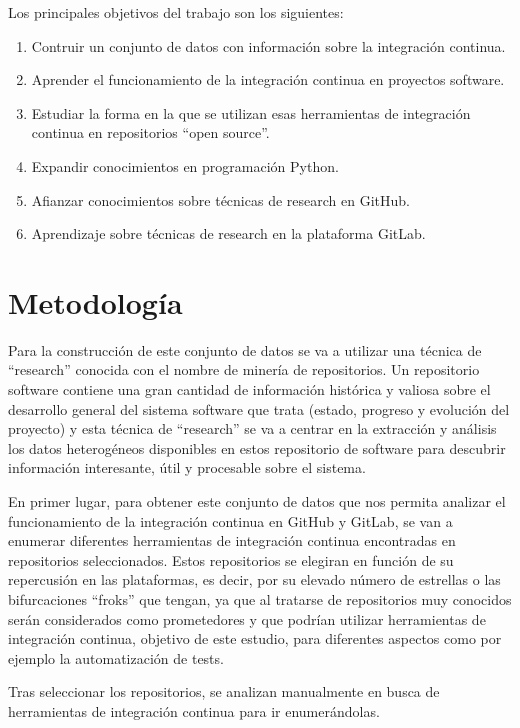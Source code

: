 Los principales objetivos del trabajo son los siguientes:
\begin{enumerate}
    \item Contruir un conjunto de datos con información sobre la integración continua.
    \item Aprender el funcionamiento de la integración continua en proyectos software.
    \item Estudiar la forma en la que se utilizan esas herramientas de integración continua en repositorios ``open source''.
    \item Expandir conocimientos en programación Python.
    \item Afianzar conocimientos sobre técnicas de research en GitHub.
    \item Aprendizaje sobre técnicas de research en la plataforma GitLab.
\end{enumerate}

\section{Metodología}

Para la construcción de este conjunto de datos se va a utilizar una técnica de ``research'' conocida con el nombre de minería de repositorios.
Un repositorio software contiene una gran cantidad de información histórica y valiosa sobre el desarrollo general del sistema software que trata (estado, progreso y evolución del proyecto) y esta técnica de ``research'' se va a centrar en la extracción y análisis los datos heterogéneos disponibles en estos repositorio de software para descubrir información interesante, útil y procesable sobre el sistema.

En primer lugar, para obtener este conjunto de datos que nos permita analizar el funcionamiento de la integración continua en GitHub y GitLab, se van a enumerar diferentes herramientas de integración continua encontradas en repositorios seleccionados. 
Estos repositorios se elegiran en función de su repercusión en las plataformas, es decir, por su elevado número de estrellas o las bifurcaciones ``froks'' que tengan, ya que al tratarse de repositorios muy conocidos serán considerados como prometedores y que podrían utilizar herramientas de integración continua, objetivo de este estudio, para diferentes aspectos como por ejemplo la automatización de tests.

Tras seleccionar los repositorios, se analizan manualmente en busca de herramientas de integración continua para ir enumerándolas.


